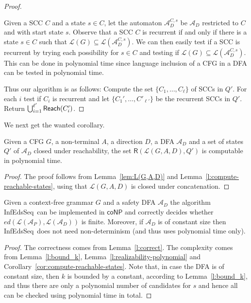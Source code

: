 \documentclass{CSML}
\newcommand{\aut}{\mathcal{A}}
\newcommand{\coNP}{\textsf{coNP}}
\newcommand{\lang}{\mathcal{L}}
\newcommand{\R}{\textsf{R}}
\newcommand{\algoFEDPDADFA}{\textsf{InfEdsSeq}}
\newcommand{\ed}{ed}
\begin{document}
\begin{proof}
\begin{itemize}
 
\end{itemize}


\noindent Given a SCC $C$ and a state $s\in C$, let the automaton $\aut_D^{C,s}$ be $\aut_D$ restricted to $C$ and with start state $s$.
Observe that a SCC $C$ is recurrent if and only if there is a state $s \in C$ such that $\lang(G)\subseteq \lang(\aut_D^{C,s})$. We can then easily test if a SCC is recurrent by trying each possibility for $s\in C$ and testing if $\lang(G)\subseteq \lang(\aut_D^{C,s})$. This can be done in polynomial time since language inclusion of a CFG in a DFA can be tested in polynomial time.

Thus our algorithm is as follows: Compute the set $\{C_1,\dots,C_\ell\}$ of SCCs in $Q'$. For each $i$ test if $C_i$ is recurrent and let $\{C_1',\dots,C'_{\ell'}\}$ be the recurrent SCCs in $Q'$. Return $\bigcup_{i=1}^{\ell'}\textsf{Reach}(C_i')$.
\end{proof}

We next get the wanted corollary.
\begin{cor}\label{cor:compute-reachable-states}
Given a CFG $G$, a non-terminal $A$, a direction $D$, a DFA $\aut_D$ and a set of states $Q'$ of $\aut_D$ closed under reachability, 
the set $\R(\lang(G,A,D), Q')$ is computable in polynomial time.
\end{cor}
\begin{proof}
The proof follows from Lemma~\ref{lem:L(G,A,D)} and Lemma~\ref{l:compute-reachable-states}, using that $\lang(G,A,D)$ is closed under concatenation.
\end{proof}



\begin{lem}
Given a context-free grammar $G$ and a safety DFA $\aut_D$ the algorithm \algoFEDPDADFA\ can be implemented in $\coNP$ and correctly decides whether $\ed(\lang(\aut_P), \lang(\aut_D))$ is finite.
Moreover, if $\aut_D$ is of constant size then \algoFEDPDADFA\ does not need non-determinism (and thus uses polynomial time only).
\label{l:FEDforSafeDFAiscoNP}
\end{lem}
\begin{proof}
The correctness comes from Lemma~\ref{l:correct}. The complexity comes from Lemma~\ref{l:bound_k}, Lemma~\ref{l:realizability-polynomial} and Corollary~\ref{cor:compute-reachable-states}. Note that, in case the DFA is of constant size, then $k$ is bounded by a constant, according to Lemma~\ref{l:bound_k}, and thus there are only a polynomial number of candidates for $s$ and hence all can be checked using polynomial time in total.
\end{proof}
\end{document}
